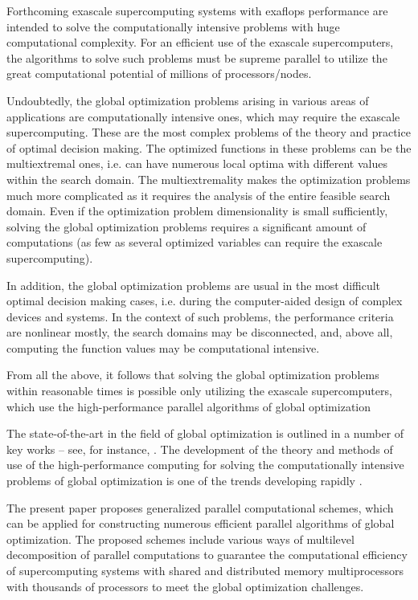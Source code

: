 \documentclass[
11pt,%
tightenlines,%
twoside,%
onecolumn,%
nofloats,%
nobibnotes,%
nofootinbib,%
superscriptaddress,%
noshowpacs,%
centertags]%
{revtex4}
\begin{document}
Forthcoming exascale supercomputing systems with exaflops performance are intended to solve the computationally intensive problems with huge computational complexity. For an efficient use of the exascale supercomputers, the algorithms to solve such problems must be supreme parallel to utilize the great computational potential of millions of processors/nodes.

Undoubtedly, the global optimization problems arising in various areas of applications are computationally intensive ones, which may require the exascale supercomputing. These are the most complex problems of the theory and practice of optimal decision making. The optimized functions in these problems can be the multiextremal ones, i.e. can have numerous local optima with different values within the search domain. The multiextremality makes the optimization problems much more complicated as it requires the analysis of the entire feasible search domain. Even if the optimization problem dimensionality is small sufficiently, solving the global optimization problems requires a significant amount of computations (as few as several optimized variables can require the exascale supercomputing).

In addition, the global optimization problems are usual in the most difficult optimal decision making cases, i.e. during the computer-aided design of complex devices and systems. In the context of such problems, the performance criteria are nonlinear mostly, the search domains may be disconnected, and, above all, computing the function values may be computational intensive.

From all the above, it follows that solving the global optimization problems within reasonable times is possible only utilizing the exascale supercomputers, which use the high-performance parallel algorithms of global optimization

The state-of-the-art in the field of global optimization is outlined in a number of key works – see, for instance, \cite{Floudas, Locatelli, Strongin1, Pardalos, Sergeyev1, Paulavicius}. The development of the theory and methods of use of the high-performance computing for solving the computationally intensive problems of global optimization is one of the trends developing rapidly \cite{Strongin1, Ciegis, Luque, Strongin2}.

The present paper proposes generalized parallel computational schemes, which can be applied for constructing numerous efficient parallel algorithms of global optimization. The proposed schemes include various ways of multilevel decomposition of parallel computations to guarantee the computational efficiency of supercomputing systems with shared and distributed memory multiprocessors with thousands of processors to meet the global optimization challenges.
\end{document}

